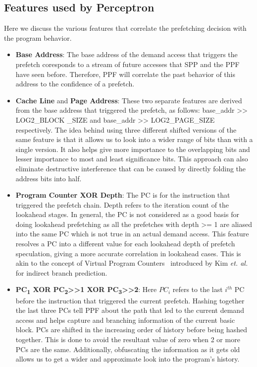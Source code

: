 \subsection{Features used by Perceptron}
\label{Impl-Features}
Here we discuss the various features that correlate the prefetching
decision with the program behavior. 

\begin{itemize}
\item \textbf{Base Address}: The base address of the demand 
access that triggers the prefetch coresponds to a stream of 
future accesses that SPP and the PPF have seen before. 
Therefore, PPF will correlate the past behavior of this address 
to the confidence of a prefetch.

\item \textbf{Cache Line} and \textbf{Page Address}: These two
  separate features are derived from the base address that triggered
  the prefetch, as follows: base\_addr >> LOG2\_BLOCK \_SIZE and
  base\_addr >> LOG2\_PAGE\_SIZE respectively. The idea behind using
  three different shifted versions of the same feature is that it
  allows us to look into a wider range of bits than with a single
  version.  It also helps give more importance to the overlapping bits
  and lesser importance to most and least significance bits. This
  approach can also eliminate destructive interference that can be
  caused by directly folding the address bits into half.


\item \textbf{Program Counter XOR Depth}: The PC is for the
  instruction that triggered the prefetch chain.  Depth refers to the
  iteration count of the lookahead stages.  In general, the PC is not
  considered as a good basis for doing lookahead prefetching as all
  the prefetches with depth >= 1 are aliased into the same PC which
  is not true in an actual demand access.  This feature resolves
  a PC into a different value for each lookahead depth of prefetch
  speculation, giving a more accurate correlation in lookahead cases.
  This is akin to the concept of Virtual Program Counters~\cite{VPC}
  introduced by Kim \textit{et. al.} for indirect branch prediction.

\item \textbf{PC\textsubscript{1} XOR PC\textsubscript{2}>>1 XOR
    PC\textsubscript{3}>>2}: Here $PC_i$ refers to the last $i^{th}$
  PC before the instruction that triggered the current prefetch.
  Hashing together the last three PCs tell PPF about the path that led
  to the current demand access and helps capture and branching
  information of the current basic block.  PCs are shifted in the
  increasing order of history before being hashed together.  This is
  done to avoid the resultant value of zero when 2 or more PCs are the
  same.  Additionally, obfuscating the information as it gets old
  allows us to get a wider and approximate look into the program's
  history.


\end{itemize}
